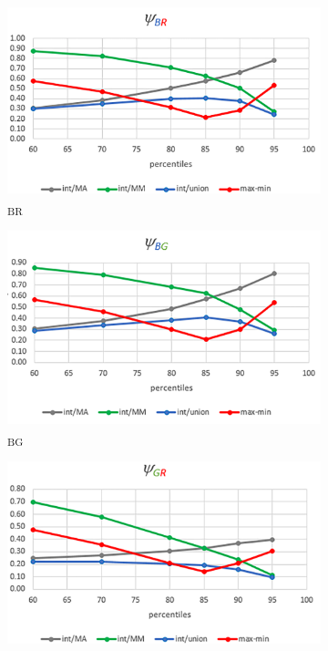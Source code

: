 \begin{figure}[h!]
     \centering
     \begin{subfigure}[b]{0.8\textwidth}
         \centering
         \includegraphics[width=\textwidth]{Imagenes/qibr.png}
         \caption{\textpsi \textsubscript{BR}}
         \label{psiBR}
     \end{subfigure}
     \hfill
     \begin{subfigure}[b]{0.8\textwidth}
         \centering
         \includegraphics[width=\textwidth]{Imagenes/qibg.png}
         \caption{\textpsi \textsubscript{BG}}
         \label{psiBG}
     \end{subfigure}
     \hfill
     \begin{subfigure}[b]{0.8\textwidth}
         \centering
         \includegraphics[width=\textwidth]{Imagenes/qigr.png}

\end{subfigure}
\end{figure}
